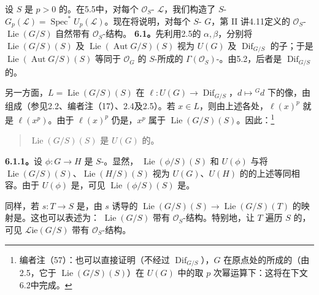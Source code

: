 设 $S$ 是 $p>0$ 的。在5.5中，对每个 $\mathcal O_S$- $\mathcal L$，我们构造了 $S$- $G_p(\mathcal L)=\operatorname{Spec}^*U_p(\mathcal L)$。现在将说明，对每个 $S$- $G$，第 II 讲4.11定义的 $\mathcal O_S$- $\operatorname{Lie}(G/S)$ 自然带有 $\mathcal O_S$-结构。
\textbf{6.1。}先利用2.5的 $\alpha,\beta$，分别将 $\operatorname{Lie}(G/S)(S)$ 及 $\operatorname{Lie}(\operatorname{Aut}G/S)(S)$ 视为 $U(G)$ 及 $\operatorname{Dif}_{G/S}$ 的子；于是 $\operatorname{Lie}(\operatorname{Aut}G/S)(S)$ 等同于 $\mathcal O_G$ 的 $S$-所成的 $\Gamma(\mathcal O_S)$-。由5.2，后者是 $\operatorname{Dif}_{G/S}$ 的。

另一方面，$L=\operatorname{Lie}(G/S)(S)$ 在
$\ell:U(G)\to\operatorname{Dif}_{G/S}$，$d\mapsto{}^Gd$ 下的像，由组成（参见2.2、编者注（17）、2.4及2.5）。若 $x\in L$，则由上述各处，$\ell(x)^p$ 就是 $\ell(x^p)$。由于 $\ell(x)^p$ 仍是，$x^p$ 属于 $\operatorname{Lie}(G/S)(S)$。因此：\footnote{编者注（57）：也可以直接证明（不经过 $\operatorname{Dif}_{G/S}$），$G$ 在原点处的所成的（由2.5，它于 $\operatorname{Lie}(G/S)(S)$）在 $U(G)$ 中的取 $p$ 次幂运算下：这将在下文6.2中完成。}
\begin{quote}
$\operatorname{Lie}(G/S)(S)$ 是 $U(G)$ 的。
\end{quote}

\textbf{6.1.1。}设 $\phi:G\to H$ 是 $S$-。显然， $\operatorname{Lie}(\phi/S)(S)$ 和 $U(\phi)$ 与将 $\operatorname{Lie}(G/S)(S)$、$\operatorname{Lie}(H/S)(S)$ 视为 $U(G)$、$U(H)$ 的的上述等同相容。由于 $U(\phi)$ 是，可见 $\operatorname{Lie}(\phi/S)(S)$ 是。

同样，若 $s:T\to S$ 是，由 $s$ 诱导的 $\operatorname{Lie}(G/S)(S)\to\operatorname{Lie}(G/S)(T)$ 的映射是。这也可以表述为： $\operatorname{Lie}(G/S)$ 带有 $\mathcal O_S$-结构。特别地，让 $T$ 遍历 $S$ 的，可见 $\mathscr{L}\mathrm{ie}(G/S)$ 带有 $\mathcal O_S$-结构。


